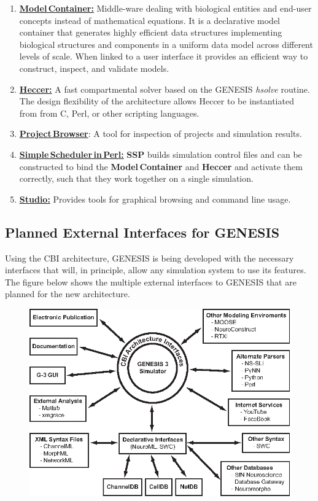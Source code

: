 \documentclass[12pt]{article}
\begin{document}
\begin{enumerate}
\item \href{../model-container/model-container.tex}{\bf Model\,Container:} Middle-ware dealing with biological entities and end-user concepts instead of mathematical equations. It is a declarative model container that generates highly efficient data structures implementing biological structures and components in a uniform data model across different levels of scale. When linked to a user interface it provides an efficient way to construct, inspect, and validate models.

\item \href{../heccer/heccer.tex}{\bf Heccer:} A fast compartmental solver based on the GENESIS {\it hsolve} routine. The design flexibility of the architecture allows Heccer to be instantiated from from C, Perl, or other scripting languages.

\item {\href{../project-browser/project-browser.tex}{\bf Project\,Browser}:} A tool for inspection of projects and simulation results.

\item \href{../ssp/ssp.tex}{\bf Simple\,Scheduler\,in\,Perl:} {\bf SSP} builds simulation control files and can be constructed to bind the {\bf Model\,Container} and {\bf Heccer} and activate them correctly, such that they work together on a single simulation.

\item \href{../studio/studio.tex}{\bf Studio:} Provides tools for graphical browsing and command line usage.
\end{enumerate}

\subsection*{Planned External Interfaces for GENESIS}

Using the CBI architecture, GENESIS is being developed with the necessary interfaces that will, in principle, allow any simulation system to use its features. The figure below shows the multiple external interfaces to GENESIS that are planned for the new architecture.

\begin{figure}[h]
  \centering
 \includegraphics[scale=1.25]{figures/G3-Interfaces.eps}
  \label{fig:g3interfaces}
\end{figure}
\end{document}

